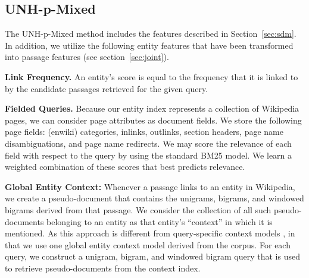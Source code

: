 \documentclass{article}
\begin{document}







\subsection{UNH-p-Mixed}\label{sec:pmixed}

The UNH-p-Mixed method includes the features described in Section~\ref{sec:sdm}. 
In addition, we utilize the following entity features that have been transformed into passage features (see section~\ref{sec:joint}).

\textbf{Link Frequency. } An entity's score is equal to the frequency that it is linked to by the candidate passages retrieved for the given query. 

\textbf{Fielded Queries.} Because our entity index represents a collection of Wikipedia pages, we can consider page attributes as document fields. We store the following page fields: (enwiki) categories, inlinks, outlinks, section headers, page name disambiguations, and page name redirects. We may score the relevance of each field with respect to the query by using the standard BM25 model. We learn a weighted combination of these scores that best predicts relevance.

\textbf{Global Entity Context:} Whenever a passage links to an entity in Wikipedia, we create a pseudo-document that contains the unigrams, bigrams, and windowed bigrams derived from that passage.  We consider the collection of all such pseudo-documents belonging to an entity as that entity's ``context'' in which it is mentioned. As this approach is different from query-specific context models  \cite{dalton2014entity}, in that we use one global entity context model derived from the corpus. For each query, we construct a unigram, bigram, and windowed bigram query that is used to retrieve pseudo-documents from the context index.
\end{document}
